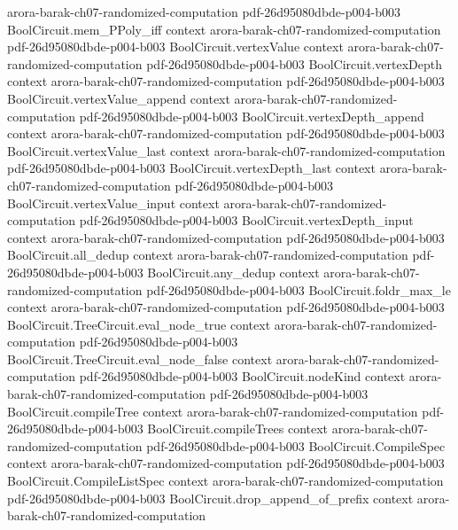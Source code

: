 \begin{theorem}
  {arora-barak-ch07-randomized-computation}
  {pdf-26d95080dbde-p004-b003}
\proofstep
  {BoolCircuit.mem_PPoly_iff}
  {context}
  {arora-barak-ch07-randomized-computation}
  {pdf-26d95080dbde-p004-b003}
\proofstep
  {BoolCircuit.vertexValue}
  {context}
  {arora-barak-ch07-randomized-computation}
  {pdf-26d95080dbde-p004-b003}
\proofstep
  {BoolCircuit.vertexDepth}
  {context}
  {arora-barak-ch07-randomized-computation}
  {pdf-26d95080dbde-p004-b003}
\proofstep
  {BoolCircuit.vertexValue_append}
  {context}
  {arora-barak-ch07-randomized-computation}
  {pdf-26d95080dbde-p004-b003}
\proofstep
  {BoolCircuit.vertexDepth_append}
  {context}
  {arora-barak-ch07-randomized-computation}
  {pdf-26d95080dbde-p004-b003}
\proofstep
  {BoolCircuit.vertexValue_last}
  {context}
  {arora-barak-ch07-randomized-computation}
  {pdf-26d95080dbde-p004-b003}
\proofstep
  {BoolCircuit.vertexDepth_last}
  {context}
  {arora-barak-ch07-randomized-computation}
  {pdf-26d95080dbde-p004-b003}
\proofstep
  {BoolCircuit.vertexValue_input}
  {context}
  {arora-barak-ch07-randomized-computation}
  {pdf-26d95080dbde-p004-b003}
\proofstep
  {BoolCircuit.vertexDepth_input}
  {context}
  {arora-barak-ch07-randomized-computation}
  {pdf-26d95080dbde-p004-b003}
\proofstep
  {BoolCircuit.all_dedup}
  {context}
  {arora-barak-ch07-randomized-computation}
  {pdf-26d95080dbde-p004-b003}
\proofstep
  {BoolCircuit.any_dedup}
  {context}
  {arora-barak-ch07-randomized-computation}
  {pdf-26d95080dbde-p004-b003}
\proofstep
  {BoolCircuit.foldr_max_le}
  {context}
  {arora-barak-ch07-randomized-computation}
  {pdf-26d95080dbde-p004-b003}
\proofstep
  {BoolCircuit.TreeCircuit.eval_node_true}
  {context}
  {arora-barak-ch07-randomized-computation}
  {pdf-26d95080dbde-p004-b003}
\proofstep
  {BoolCircuit.TreeCircuit.eval_node_false}
  {context}
  {arora-barak-ch07-randomized-computation}
  {pdf-26d95080dbde-p004-b003}
\proofstep
  {BoolCircuit.nodeKind}
  {context}
  {arora-barak-ch07-randomized-computation}
  {pdf-26d95080dbde-p004-b003}
\proofstep
  {BoolCircuit.compileTree}
  {context}
  {arora-barak-ch07-randomized-computation}
  {pdf-26d95080dbde-p004-b003}
\proofstep
  {BoolCircuit.compileTrees}
  {context}
  {arora-barak-ch07-randomized-computation}
  {pdf-26d95080dbde-p004-b003}
\proofstep
  {BoolCircuit.CompileSpec}
  {context}
  {arora-barak-ch07-randomized-computation}
  {pdf-26d95080dbde-p004-b003}
\proofstep
  {BoolCircuit.CompileListSpec}
  {context}
  {arora-barak-ch07-randomized-computation}
  {pdf-26d95080dbde-p004-b003}
\proofstep
  {BoolCircuit.drop_append_of_prefix}
  {context}
  {arora-barak-ch07-randomized-computation}

\end{theorem}
